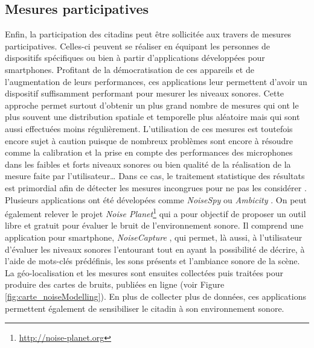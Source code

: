 \subsection{Mesures participatives}

Enfin, la participation des citadins peut être sollicitée aux travers de mesures participatives. Celles-ci peuvent se réaliser en équipant les personnes de dispositifs spécifiques \cite{aumond2017study} ou bien à partir d'applications développées pour smartphones. Profitant de la démocratisation de ces appareils et de l'augmentation de leurs performances, ces applications leur permettent d'avoir un dispositif suffisamment performant pour mesurer les niveaux sonores. Cette approche permet surtout d'obtenir un plus grand nombre de mesures qui ont le plus souvent une distribution spatiale et temporelle plus aléatoire mais qui sont aussi effectuées moins régulièrement. L'utilisation de ces mesures est toutefois encore sujet à caution puisque de nombreux problèmes sont encore à résoudre comme la calibration et la prise en compte des performances des microphones dans les faibles et forts niveaux sonores ou bien qualité de la réalisation de la mesure faite par l'utilisateur\dots{} Dans ce cas, le traitement statistique des résultats est primordial afin de détecter les mesures incongrues pour ne pas les considérer \cite{guillaume2016noise}. Plusieurs applications ont été dévelopées comme \textit{NoiseSpy} \cite{kanjo_noisespy_2010} ou \textit{Ambicity} \cite{ventura2017estimation}. On peut également relever le projet \textit{Noise Planet}\footnote{\url{http://noise-planet.org}} qui a pour objectif de proposer un outil libre et gratuit pour évaluer le bruit de l'environnement sonore. Il comprend une application pour smartphone, \textit{NoiseCapture} \cite{guillaume2016noise}, qui permet, là aussi, à l'utilisateur d'évaluer les niveaux sonores l'entourant tout en ayant la possibilité de décrire, à l'aide de mots-clés prédéfinis, les sons présents et l'ambiance sonore de la scène. La géo-localisation et les mesures sont ensuites collectées puis traitées pour produire des cartes de bruits, publiées en ligne (voir Figure \ref{fig:carte_noiseModelling}). En plus de collecter plus de données, ces applications permettent également de sensibiliser le citadin à son environnement sonore.\\ 

